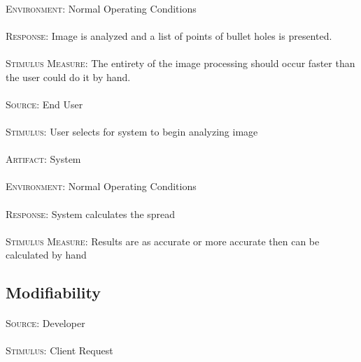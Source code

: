 \paragraph{}\textsc{Environment:} Normal Operating Conditions
\paragraph{}\textsc{Response:} Image is analyzed and a list of points of bullet holes is presented.
\paragraph{}\textsc{Stimulus Measure:} The entirety of the image processing should occur faster than the user could do it by hand.

\paragraph{}\textsc{Source:} End User
\paragraph{}\textsc{Stimulus:} User selects for system to begin analyzing image
\paragraph{}\textsc{Artifact:} System
\paragraph{}\textsc{Environment:} Normal Operating Conditions
\paragraph{}\textsc{Response:} System calculates the spread
\paragraph{}\textsc{Stimulus Measure:} Results are as accurate or more accurate then can be calculated by hand

\subsection{Modifiability}
\paragraph{}\textsc{Source:} Developer
\paragraph{}\textsc{Stimulus:} Client Request

